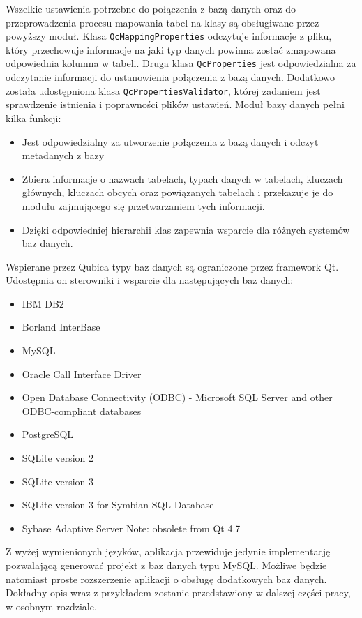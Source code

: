 \documentclass[12pt]{report}
\begin{document}
Wszelkie ustawienia potrzebne do połączenia z bazą danych oraz do przeprowadzenia procesu mapowania tabel na klasy są obsługiwane przez powyższy moduł. {\color{black}Klasa {\tt QcMappingProperties} odczytuje informacje z pliku, który przechowuje informacje na jaki typ danych powinna zostać zmapowana odpowiednia kolumna w tabeli. Druga klasa {\tt QcProperties} jest odpowiedzialna za odczytanie informacji do ustanowienia połączenia z bazą danych. Dodatkowo została udostępniona klasa {\tt QcPropertiesValidator}, której zadaniem jest sprawdzenie istnienia i poprawności plików ustawień.}
\newpage
Moduł bazy danych pełni kilka funkcji:
\begin{itemize}
\item{Jest odpowiedzialny za utworzenie połączenia z bazą danych i odczyt metadanych z bazy}
\item{Zbiera informacje o nazwach tabelach, typach danych w tabelach, kluczach głównych, kluczach obcych oraz powiązanych tabelach i przekazuje je do modułu zajmującego się przetwarzaniem tych informacji.}
\item{Dzięki odpowiedniej hierarchii klas zapewnia wsparcie dla różnych systemów baz danych. }
\end{itemize}

Wspierane przez Qubica typy baz danych są ograniczone przez framework Qt. Udostępnia on sterowniki i wsparcie dla następujących baz danych:
\begin{itemize}
\item{IBM DB2}
\item{Borland InterBase}
\item{MySQL}
\item{Oracle Call Interface Driver}
\item{Open Database Connectivity (ODBC) - Microsoft SQL Server and other ODBC-compliant databases}
\item{PostgreSQL}
\item{SQLite version 2}
\item{SQLite version 3}
\item{SQLite version 3 for Symbian SQL Database}
\item{Sybase Adaptive Server Note: obsolete from Qt 4.7}
\end{itemize}

{\color{black} Z wyżej wymienionych języków, aplikacja przewiduje jedynie implementację pozwalającą generować projekt z baz danych typu MySQL. Możliwe będzie natomiast proste rozszerzenie aplikacji o obsługę dodatkowych baz danych. Dokładny opis wraz z przykładem zostanie przedstawiony w dalszej części pracy, w osobnym rozdziale.}
\end{document}
